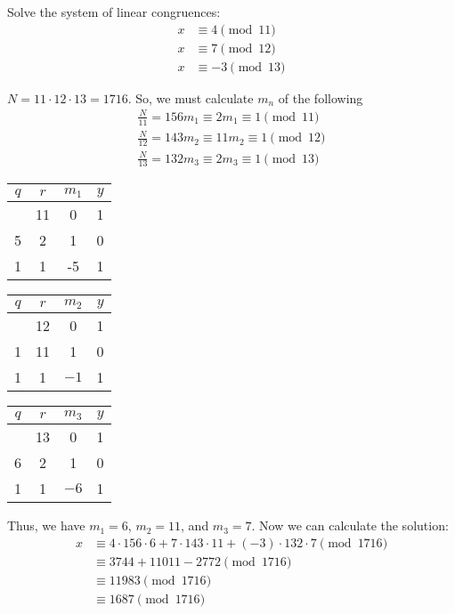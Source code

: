 \documentclass{article}
\begin{document}
\begin{problem}{}{}
    Solve the system of linear congruences:
    \begin{align*}
        x &\equiv 4 \pmod{11} \\
        x &\equiv 7 \pmod{12} \\
        x &\equiv -3 \pmod{13}
    \end{align*}
\end{problem}
\begin{solution}{}{}
    $N=11 \cdot 12 \cdot 13 = 1716$. So, we must calculate $m_n$ of the following
    \begin{align*}
        \frac{N}{11} = 156m_1 \equiv 2m_1 \equiv 1 \pmod{11}\\
        \frac{N}{12} = 143m_2 \equiv 11m_2 \equiv 1 \pmod{12} \\
        \frac{N}{13} = 132m_3 \equiv 2m_3 \equiv 1 \pmod{13}
    \end{align*}
    \begin{center}
        \begin{tabular}{c c c c}
            $q$ & $r$ & $m_1$ & $y$ \\
            \hline
            & 11 & 0 & 1 \\
            5 & 2 & 1 & 0 \\
            1 & 1 & -5 & 1 \\
        \end{tabular}
        \quad
        \begin{tabular}{c c c c}
            $q$ & $r$ & $m_2$ & $y$ \\
            \hline
            & 12 & 0 & 1 \\
            1 & 11 & 1 & 0 \\
            1 & 1 & $-1$ & 1
        \end{tabular}
        \quad
        \begin{tabular}{c c c c}
            $q$ & $r$ & $m_3$ & $y$ \\
            \hline
            & 13 & 0 & 1 \\
            6 & 2 & 1 & 0 \\
            1 & 1 & $-6$ & 1
        \end{tabular}
    \end{center}
    Thus, we have $m_1=6$, $m_2=11$, and $m_3=7$. Now we can calculate the solution:
    \begin{align*}
        x &\equiv 4 \cdot 156 \cdot 6 + 7 \cdot 143 \cdot 11 + (-3) \cdot 132 \cdot 7 \pmod{1716} \\
        &\equiv 3744 + 11011 - 2772 \pmod{1716} \\
        &\equiv 11983 \pmod{1716} \\
        &\equiv 1687 \pmod{1716} \\
    \end{align*}
\end{solution}
\end{document}
